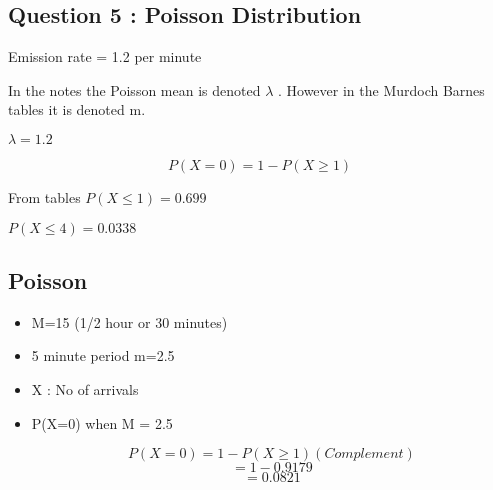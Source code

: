 \subsection{Question 5 : Poisson Distribution}

Emission rate = 1.2 per minute

In the notes the Poisson mean is denoted $\lambda$ . However in the Murdoch Barnes tables it is denoted m.

$\lambda = 1.2$




\[P(X=0) = 1 - P(X\geq 1)\]

From tables $P(X \leq 1) = 0.699$


$P(X \leq 4) = 0.0338 $

\subsection{Poisson }
\begin{itemize}
\item M=15
(1/2 hour or 30 minutes)

\item 5 minute period 
m=2.5 

\item X : No of arrivals

\item P(X=0) when M = 2.5

\[P(X=0) = 1 - P(X \geq 1) (Complement)\]
\[= 1 - 0.9179\]
\[= 0.0821\]


\end{itemize}
